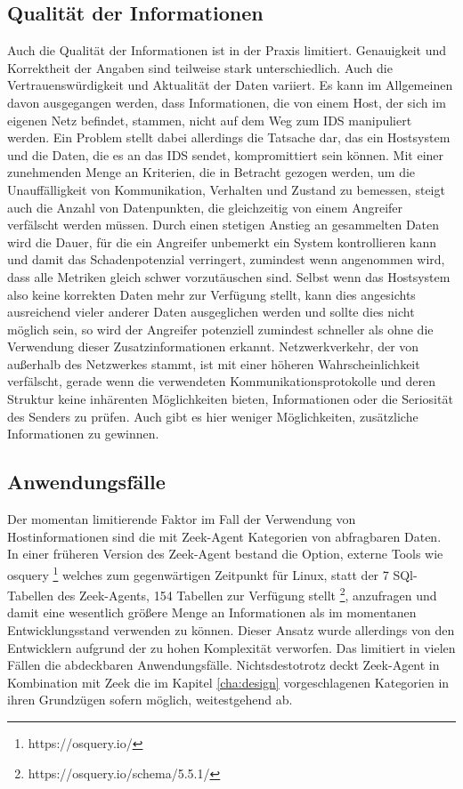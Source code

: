 \subsection{Qualität der Informationen}
Auch die Qualität der Informationen ist in der Praxis limitiert. Genauigkeit und Korrektheit der Angaben sind teilweise stark unterschiedlich. Auch die Vertrauenswürdigkeit und Aktualität der Daten variiert. Es kann im Allgemeinen davon ausgegangen werden, dass Informationen, die von einem Host, der sich im eigenen Netz befindet, stammen, nicht auf dem Weg zum IDS manipuliert werden. Ein Problem stellt dabei allerdings die Tatsache dar, das ein Hostsystem und die Daten, die es an das IDS sendet, kompromittiert sein können. Mit einer zunehmenden Menge an Kriterien, die in Betracht gezogen werden, um die Unauffälligkeit von Kommunikation, Verhalten und Zustand zu bemessen, steigt auch die Anzahl von Datenpunkten, die gleichzeitig von einem Angreifer verfälscht werden müssen. Durch einen stetigen Anstieg an gesammelten Daten wird die Dauer, für die ein Angreifer unbemerkt ein System kontrollieren kann und damit das Schadenpotenzial verringert, zumindest wenn angenommen wird, dass alle Metriken gleich schwer vorzutäuschen sind. Selbst wenn das Hostsystem also keine korrekten Daten mehr zur Verfügung stellt, kann dies angesichts ausreichend vieler anderer Daten ausgeglichen werden und sollte dies nicht möglich sein, so wird der Angreifer potenziell zumindest schneller als ohne die Verwendung dieser Zusatzinformationen erkannt. Netzwerkverkehr, der von außerhalb des Netzwerkes stammt, ist mit einer höheren Wahrscheinlichkeit verfälscht, gerade wenn die verwendeten Kommunikationsprotokolle und deren Struktur keine inhärenten Möglichkeiten bieten, Informationen oder die Seriosität des Senders zu prüfen. Auch gibt es hier weniger Möglichkeiten, zusätzliche Informationen zu gewinnen.
\subsection{Anwendungsfälle}
Der momentan limitierende Faktor im Fall der Verwendung von Hostinformationen sind die mit Zeek-Agent Kategorien von abfragbaren Daten. In einer früheren Version des Zeek-Agent bestand die Option, externe Tools wie osquery \footnote{https://osquery.io/} welches zum gegenwärtigen Zeitpunkt für Linux, statt der 7 SQl-Tabellen des Zeek-Agents, 154 Tabellen zur Verfügung stellt \footnote{https://osquery.io/schema/5.5.1/}, anzufragen und damit eine wesentlich größere Menge an Informationen als im momentanen Entwicklungsstand verwenden zu können. Dieser Ansatz wurde allerdings von den Entwicklern aufgrund der zu hohen Komplexität verworfen. Das limitiert in vielen Fällen die abdeckbaren Anwendungsfälle. Nichtsdestotrotz deckt Zeek-Agent in Kombination mit Zeek die im Kapitel \ref{cha:design} vorgeschlagenen Kategorien in ihren Grundzügen sofern möglich, weitestgehend ab.
